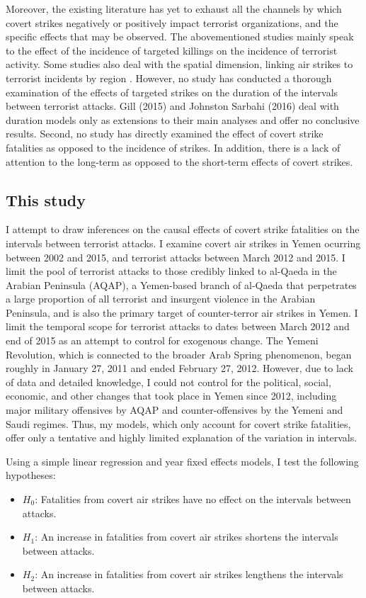 \documentclass[letterpaper,12pt]{article}
\theoremstyle{definition}
\begin{document}
Moreover, the existing literature has yet to exhaust all the channels by which covert strikes negatively or positively impact terrorist organizations, and the specific effects that may be observed. The abovementioned studies mainly speak to the effect of the incidence of targeted killings on the incidence of terrorist activity. Some studies also deal with the spatial dimension, linking air strikes to terrorist incidents by region \cite{lyall,johnstonsarbahi}. However, no study has conducted a thorough examination of the effects of targeted strikes on the duration of the intervals between terrorist attacks. Gill (2015) and Johnston Sarbahi (2016) deal with duration models only as extensions to their main analyses and offer no conclusive results. Second, no study has directly examined the effect of covert strike fatalities as opposed to the incidence of strikes. In addition, there is a lack of attention to the long-term as opposed to the short-term effects of covert strikes.

\subsection{This study}

I attempt to draw inferences on the causal effects of covert strike fatalities on the intervals between terrorist attacks. I examine covert air strikes in Yemen ocurring between 2002 and 2015, and terrorist attacks between March 2012 and 2015. I limit the pool of terrorist attacks to those credibly linked to al-Qaeda in the Arabian Peninsula (AQAP), a Yemen-based branch of al-Qaeda that perpetrates a large proportion of all terrorist and insurgent violence in the Arabian Peninsula, and is also the primary target of counter-terror air strikes in Yemen. I limit the temporal scope for terrorist attacks to dates between March 2012 and end of 2015 as an attempt to control for exogenous change. The Yemeni Revolution, which is connected to the broader Arab Spring phenomenon, began roughly in January 27, 2011 and ended February 27, 2012. However, due to lack of data and detailed knowledge, I could not control for the political, social, economic, and other changes that took place in Yemen since 2012, including major military offensives by AQAP and counter-offensives by the Yemeni and Saudi regimes. Thus, my models, which only account for covert strike fatalities, offer only a tentative and highly limited explanation of the variation in intervals. 

Using a simple linear regression and year fixed effects models, I test the following hypotheses:
\begin{itemize}
  \item $H_0$: Fatalities from covert air strikes have no effect on the intervals between attacks.
  \item $H_1$: An increase in fatalities from covert air strikes shortens the intervals between attacks.
  \item $H_2$: An increase in fatalities from covert air strikes lengthens the intervals between attacks.
\end{itemize}
\end{document}
